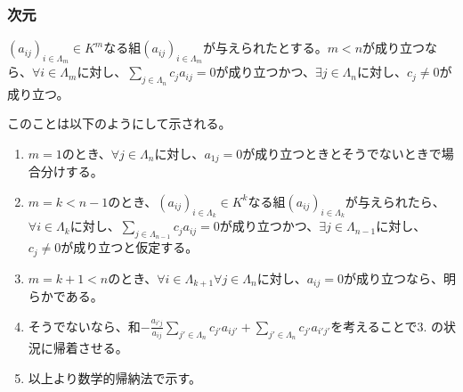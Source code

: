 \documentclass[dvipdfmx]{jsarticle}
\begin{document}
\subsubsection{次元}%
\begin{thm}\label{2.1.1.17}
$\left( a_{ij} \right)_{i \in \varLambda_{m}} \in K^{m}$なる組$\left( a_{ij} \right)_{i \in \varLambda_{m}}$が与えられたとする。$m < n$が成り立つなら、$\forall i \in \varLambda_{m}$に対し、$\sum_{j \in \varLambda_{n}} {c_{j}a_{ij}}=0$が成り立つかつ、$\exists j \in \varLambda_{n}$に対し、$c_{j} \neq 0$が成り立つ。\par
このことは以下のようにして示される。
\begin{enumerate}
\item
  $m = 1$のとき、$\forall j \in \varLambda_{n}$に対し、$a_{1j} = 0$が成り立つときとそうでないときで場合分けする。
\item
  $m = k < n - 1$のとき、$\left( a_{ij} \right)_{i \in \varLambda_{k}} \in K^{k}$なる組$\left( a_{ij} \right)_{i \in \varLambda_{k}}$が与えられたら、$\forall i \in \varLambda_{k}$に対し、$\sum_{j \in \varLambda_{n - 1}} {c_{j}a_{ij}}=0$が成り立つかつ、$\exists j \in \varLambda_{n - 1}$に対し、$c_{j} \neq 0$が成り立つと仮定する。
\item
  $m = k + 1 < n$のとき、$\forall i \in \varLambda_{k + 1}\forall j \in \varLambda_{n}$に対し、$a_{ij} = 0$が成り立つなら、明らかである。
\item
  そうでないなら、和$- \frac{a_{i'j}}{a_{ij}}\sum_{j' \in \varLambda_{n}} {c_{j'}a_{ij'}} + \sum_{j' \in \varLambda_{n}} {c_{j'}a_{i'j'}}$を考えることで3. の状況に帰着させる。
\item
  以上より数学的帰納法で示す。
\end{enumerate}
\end{thm}
\end{document}
